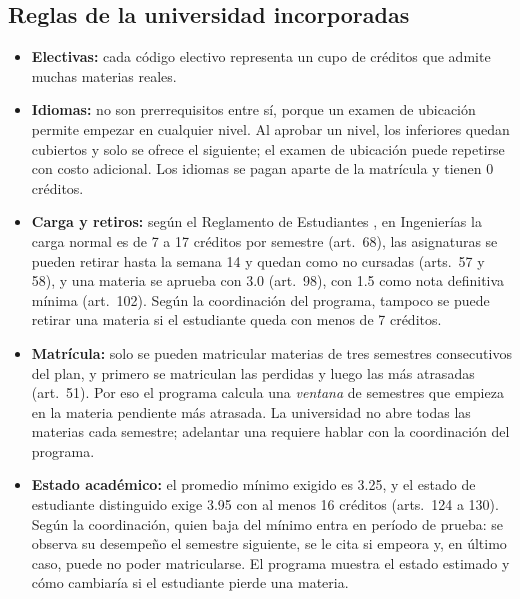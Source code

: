 \documentclass[11pt,a4paper]{article}
\begin{document}
\subsection{Reglas de la universidad incorporadas}
\begin{itemize}
  \item \textbf{Electivas:} cada código electivo representa un cupo de créditos que admite muchas materias reales.
  \item \textbf{Idiomas:} no son prerrequisitos entre sí, porque un examen de ubicación permite empezar en cualquier nivel. Al aprobar un nivel, los inferiores quedan cubiertos y solo se ofrece el siguiente; el examen de ubicación puede repetirse con costo adicional. Los idiomas se pagan aparte de la matrícula y tienen 0 créditos.
  \item \textbf{Carga y retiros:} según el Reglamento de Estudiantes \parencite{uninorte2012}, en Ingenierías la carga normal es de 7 a 17 créditos por semestre (art.~68), las asignaturas se pueden retirar hasta la semana 14 y quedan como no cursadas (arts.~57 y 58), y una materia se aprueba con 3.0 (art.~98), con 1.5 como nota definitiva mínima (art.~102). Según la coordinación del programa, tampoco se puede retirar una materia si el estudiante queda con menos de 7 créditos.
  \item \textbf{Matrícula:} solo se pueden matricular materias de tres semestres consecutivos del plan, y primero se matriculan las perdidas y luego las más atrasadas (art.~51). Por eso el programa calcula una \emph{ventana} de semestres que empieza en la materia pendiente más atrasada. La universidad no abre todas las materias cada semestre; adelantar una requiere hablar con la coordinación del programa.
  \item \textbf{Estado académico:} el promedio mínimo exigido es 3.25, y el estado de estudiante distinguido exige 3.95 con al menos 16 créditos (arts.~124 a 130). Según la coordinación, quien baja del mínimo entra en período de prueba: se observa su desempeño el semestre siguiente, se le cita si empeora y, en último caso, puede no poder matricularse. El programa muestra el estado estimado y cómo cambiaría si el estudiante pierde una materia.
\end{itemize}
\end{document}

